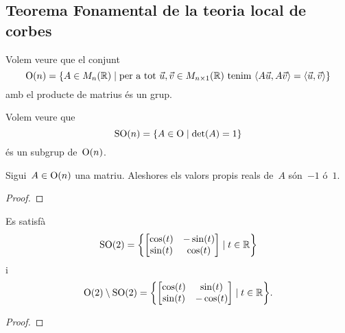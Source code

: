 \documentclass[../../main.tex]{subfiles}
\begin{document}
	\subsection{Teorema Fonamental de la teoria local de corbes}
	\begin{example}
		\label{ex:grup ortogonal}
		Volem veure que el conjunt
		\[
		    \GrupOrtogonal(n)=\{A\in\matrius_{n}(\mathbb{R})\mid\text{per a tot }\vec{u},\vec{v}\in\matrius_{n\times1}(\mathbb{R})\text{ tenim }\prodesc{A\vec{u}}{A\vec{v}}=\prodesc{\vec{u}}{\vec{v}}\}
		\]
		amb el producte de matrius és un grup.
		\begin{solution}
		\end{solution}
	\end{example}
	\begin{example}
		\label{ex:grup especial ortogonal}
		Volem veure que
		\[
		    \operatorname{SO}(n)=\{A\in\operatorname{O}\mid\det(A)=1\}
		\]
		és un subgrup de~\(\operatorname{O}(n)\).
		\begin{solution}
		\end{solution}
	\end{example}
	\begin{proposition}
		\label{prop:els valors propis d'una matriu ortogonal són -1 o 1}
		Sigui~\(A\in\operatorname{O}(n)\) una matriu.
		Aleshores els valors propis reals de~\(A\) són~\(-1\) ó~\(1\).
		\begin{proof}
		\end{proof}
	\end{proposition}
	\begin{proposition}
		\label{prop:caracterització de les matrius ortogonals 2x2}
		Es satisfà
		\[\GrupEspecialOrtogonal(2)=\left\{\begin{bmatrix}
			\cos(t) & -\sin(t) \\
			\sin(t) & \cos(t)
		\end{bmatrix}\mid t\in\mathbb{R}\right\}\]
		i
		\[\GrupOrtogonal(2)\setminus\GrupEspecialOrtogonal(2)=\left\{\begin{bmatrix}
			\cos(t) & \sin(t) \\
			\sin(t) & -\cos(t)
		\end{bmatrix}\mid t\in\mathbb{R}\right\}.\]
		\begin{proof}
		\end{proof}
	\end{proposition}
\end{document}
